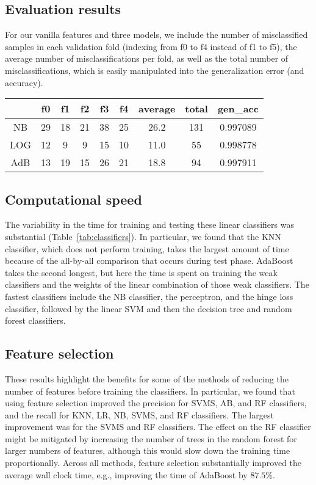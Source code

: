 \documentclass{article} %
\begin{document}
\subsection{Evaluation results}
For our vanilla features and three models, we include the number of misclassified samples in each validation fold (indexing from f0 to f4 instead of f1 to f5), the average number of misclassifications per fold, as well as the total number of misclassifications, which is easily manipulated into the generalization error (and accuracy).
\begin{table}[h]
\centering
\large
\begin{tabular}{|c|c|c|c|c|c|c|c|c|}
\hline
    & f0 & f1 & f2 & f3 & f4 & average & total & gen\_acc \\ \hline
NB  & 29 & 18 & 21 & 38 & 25 & 26.2    & 131   & 0.997089 \\ \hline
LOG & 12 & 9  & 9  & 15 & 10 & 11.0    & 55    & 0.998778 \\ \hline
AdB & 13 & 19 & 15 & 26 & 21 & 18.8    & 94    & 0.997911 \\ \hline
\end{tabular}
\end{table}

\subsection{Computational speed}

The variability in the time for training and testing these linear classifiers was substantial (Table~\ref{tab:classifiers}). In particular, we found that the KNN classifier, which does not perform training, takes the largest amount of time because of the all-by-all comparison that occurs during test phase. AdaBoost takes the second longest, but here the time is spent on training the weak classifiers and the weights of the linear combination of those weak classifiers. The fastest classifiers include the NB classifier, the perceptron, and the hinge loss classifier, followed by the linear SVM and then the decision tree and random forest classifiers.

\subsection{Feature selection}

These results highlight the benefits for some of the methods of reducing the number of features before training the classifiers. In particular, we found that using feature selection improved the precision for SVMS, AB, and RF classifiers, and the recall for KNN, LR, NB, SVMS, and RF classifiers. The largest improvement was for the SVMS and RF classifiers. The effect on the RF classifier might be mitigated by increasing the number of trees in the random forest for larger numbers of features, although this would slow down the training time proportionally. Across all methods, feature selection substantially improved the average wall clock time, e.g., improving the time of AdaBoost by $87.5\%$.
\end{document}
